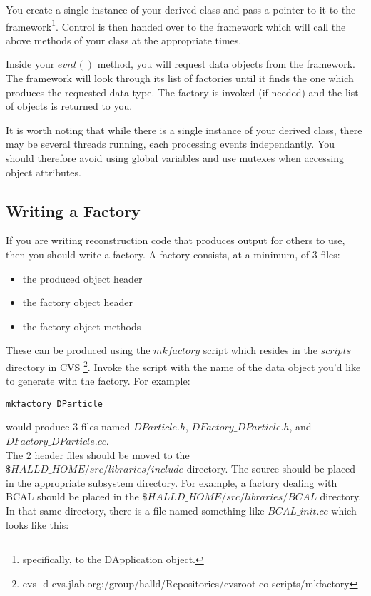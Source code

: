 \documentclass[12pt]{article}
\begin{document}
You create a single instance of your derived class and pass a pointer
to it to the framework\footnote{specifically, to the DApplication object.}.
Control is then
handed over to the framework which will call the above methods of your
class at the appropriate times.

Inside your $evnt()$ method, you will request data objects from the 
framework.
The framework will look through its list of factories
until it finds the one which produces the requested data type.
The factory is invoked (if needed) and the list of objects is
returned to you.

It is worth noting that while there is a single instance of your 
derived class, there may be several threads running, each 
processing events independantly. You should therefore avoid using
global variables and use mutexes when accessing object attributes.


\subsection{Writing a Factory}
\label{factory}
If you are writing reconstruction code that produces output for others
to use, then you should write a factory. A factory consists, at a
minimum, of 3 files:

\begin{itemize}
	\item{the produced object header}
	\item{the factory object header}
	\item{the factory object methods}
\end{itemize}
These can be produced using the $mkfactory$ script which resides in
the $scripts$ directory in CVS
\footnote{cvs -d cvs.jlab.org:/group/halld/Repositories/cvsroot co scripts/mkfactory}.
Invoke the script with the name of the data object you'd like to
generate with the factory. For example:

\begin{lstlisting}[frame=shadowbox,backgroundcolor=\color{cmdbkgd}]
mkfactory DParticle
\end{lstlisting}

would produce 3 files named $DParticle.h$, $DFactory\_DParticle.h$,
and $DFactory\_DParticle.cc$.\\

The 2 header files should be moved to the $\$HALLD\_HOME/src/libraries/include$
directory. The source should be placed in the appropriate subsystem
directory. For example, a factory dealing with BCAL should be placed
in the $\$HALLD\_HOME/src/libraries/BCAL$ directory. In that same
directory, there is a file named something like $BCAL\_init.cc$
which looks like this:
\end{document}

